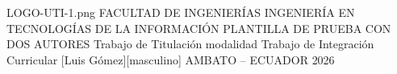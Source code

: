 \documentclass[12pt,a4paper,oneside]{report}
\begin{document}
\UTIPortada
{LOGO-UTI-1.png}
{FACULTAD DE INGENIERÍAS}
{INGENIERÍA EN TECNOLOGÍAS DE LA INFORMACIÓN}
{PLANTILLA DE PRUEBA CON DOS AUTORES}
{Trabajo de Titulación modalidad Trabajo de Integración Curricular}
{[Luis Gómez][masculino]}
{}
{AMBATO -- ECUADOR}
{2026}
\UTIFrontMatter


\end{document}
